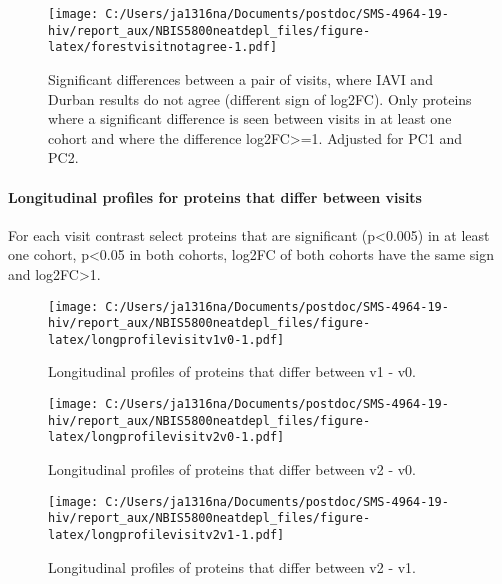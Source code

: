 \documentclass[
]{article}
\begin{document}
\begin{figure}
\centering
\texttt{[image: C:/Users/ja1316na/Documents/postdoc/SMS-4964-19-hiv/report\_aux/NBIS5800neatdepl\_files/figure-latex/forestvisitnotagree-1.pdf]}
\caption{\label{fig:forestvisitnotagree}Significant differences between a pair of visits, where IAVI and Durban results do not agree (different sign of log2FC). Only proteins where a significant difference is seen between visits in at least one cohort and where the difference \textbar log2FC\textbar\textgreater=1. Adjusted for PC1 and PC2.}
\end{figure}

\FloatBarrier

\FloatBarrier

\FloatBarrier

\hypertarget{longitudinal-profiles-for-proteins-that-differ-between-visits}{%
\paragraph{Longitudinal profiles for proteins that differ between visits}\label{longitudinal-profiles-for-proteins-that-differ-between-visits}}

For each visit contrast select proteins that are significant (p\textless0.005) in at least one cohort, p\textless0.05 in both cohorts, log2FC of both cohorts have the same sign and \textbar log2FC\textbar\textgreater1.

\begin{figure}
\centering
\texttt{[image: C:/Users/ja1316na/Documents/postdoc/SMS-4964-19-hiv/report\_aux/NBIS5800neatdepl\_files/figure-latex/longprofilevisitv1v0-1.pdf]}
\caption{\label{fig:longprofilevisitv1v0}Longitudinal profiles of proteins that differ between v1 - v0.}
\end{figure}

\begin{figure}
\centering
\texttt{[image: C:/Users/ja1316na/Documents/postdoc/SMS-4964-19-hiv/report\_aux/NBIS5800neatdepl\_files/figure-latex/longprofilevisitv2v0-1.pdf]}
\caption{\label{fig:longprofilevisitv2v0}Longitudinal profiles of proteins that differ between v2 - v0.}
\end{figure}

\begin{figure}
\centering
\texttt{[image: C:/Users/ja1316na/Documents/postdoc/SMS-4964-19-hiv/report\_aux/NBIS5800neatdepl\_files/figure-latex/longprofilevisitv2v1-1.pdf]}
\caption{\label{fig:longprofilevisitv2v1}Longitudinal profiles of proteins that differ between v2 - v1.}
\end{figure}
\end{document}
